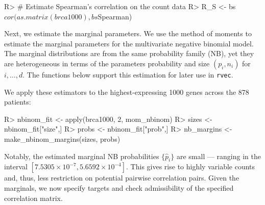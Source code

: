 \documentclass[
]{jss}
\begin{document}
\begin{CodeChunk}
\begin{CodeInput}
R> # Estimate Spearman's correlation on the count data
R> R_S <- bs$cor(as.matrix(brca1000), bs$Spearman)
\end{CodeInput}
\end{CodeChunk}

Next, we estimate the marginal parameters. We use the method of moments to estimate the marginal parameters for the multivariate negative binomial model. The marginal distributions are from the same probability family (NB), yet they are heterogeneous in terms of the parameters probability and size \((p_i, n_i)\) for \(i,\ldots,d\). The functions below support this estimation for later use in \texttt{rvec}.

\begin{CodeChunk}
\end{CodeChunk}

We apply these estimators to the highest-expressing 1000 genes across the 878 patients:

\begin{CodeChunk}
\begin{CodeInput}
R> nbinom_fit <- apply(brca1000, 2, mom_nbinom)
R> sizes <- nbinom_fit["size",]
R> probs <- nbinom_fit["prob",]
R> nb_margins <- make_nbinom_margins(sizes, probs)
\end{CodeInput}
\end{CodeChunk}

Notably, the estimated marginal NB probabilities \(\{ \hat{p}_i \}\) are small --- ranging in the interval \([\ensuremath{7.5305\times 10^{-7}} , \ensuremath{5.6592\times 10^{-4}}]\). This gives rise to highly variable counts and, thus, less restriction on potential pairwise correlation pairs. Given the marginals, we now specify targets and check admissibility of the specified correlation matrix.
\end{document}

